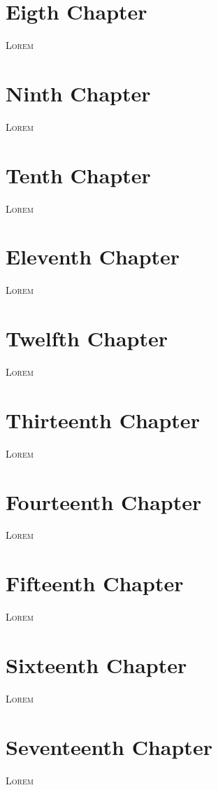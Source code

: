 \documentclass[a4paper,oneside,11pt]{memoir}
\begin{document}
\chapter{Eigth Chapter}
\lettrine{\textcolor[gray]{0.5}{L}}{orem} \lipsum[1-3]

\chapter{Ninth Chapter}
\lettrine{\textcolor[gray]{0.5}{L}}{orem} \lipsum[1-3]

\chapter{Tenth Chapter}
\lettrine{\textcolor[gray]{0.5}{L}}{orem} \lipsum[1-3]

\chapter{Eleventh Chapter}
\lettrine{\textcolor[gray]{0.5}{L}}{orem} \lipsum[1-3]

\chapter{Twelfth Chapter}
\lettrine{\textcolor[gray]{0.5}{L}}{orem} \lipsum[1-3]

\chapter{Thirteenth Chapter}
\lettrine{\textcolor[gray]{0.5}{L}}{orem} \lipsum[1-3]

\chapter{Fourteenth Chapter}
\lettrine{\textcolor[gray]{0.5}{L}}{orem} \lipsum[1-3]

\chapter{Fifteenth Chapter}
\lettrine{\textcolor[gray]{0.5}{L}}{orem} \lipsum[1-3]

\chapter{Sixteenth Chapter}
\lettrine{\textcolor[gray]{0.5}{L}}{orem} \lipsum[1-3]

\chapter{Seventeenth Chapter}
\lettrine{\textcolor[gray]{0.5}{L}}{orem} \lipsum[1-3]
\end{document}
